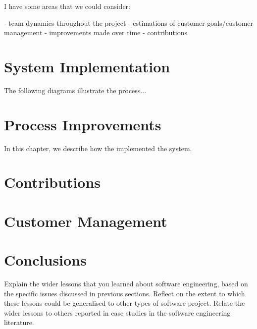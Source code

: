 \documentclass{l3proj}
\begin{document}

 I have some areas that we could consider:

  - team dynamics throughout the project
  - estimations of customer goals/customer management
  - improvements made over time
  - contributions





\section{System Implementation}
\label{design}

The following diagrams illustrate the
process...

\section{Process Improvements}
\label{managing}

In this chapter, we describe how the implemented the system.

\section{Contributions}



\section{Customer Management}
\label{sec:managing}


\section{Conclusions}

Explain the wider lessons that you learned about software engineering,
based on the specific issues discussed in previous sections.  Reflect
on the extent to which these lessons could be generalised to other
types of software project.  Relate the wider lessons to others
reported in case studies in the software engineering literature.



\end{document}
